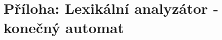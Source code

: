 \documentclass[12pt,a4paper,titlepage,final]{article}
\begin{document}
\section{Příloha: Lexikální analyzátor - konečný automat} \label{lexautomat}
\begin{center}
\end{center}
\end{document}
